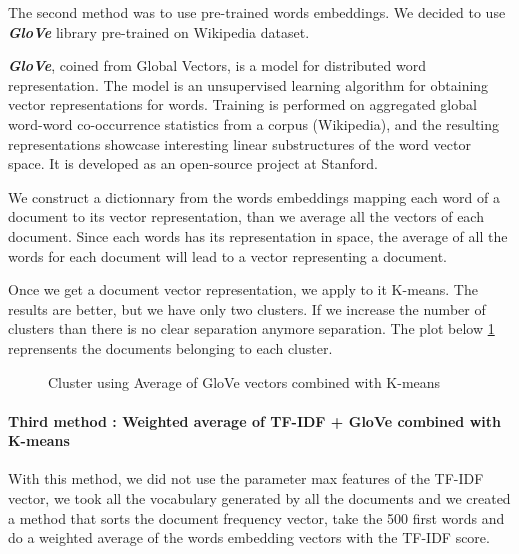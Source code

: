 \documentclass[article,twocolumn]{IEEEtran}
\begin{document}
The second method was to use pre-trained words embeddings. We decided to
use \textbf{\emph{GloVe}} library pre-trained on Wikipedia dataset.

\textbf{\emph{GloVe}}, coined from Global Vectors, is a model for
distributed word representation. The model is an unsupervised learning
algorithm for obtaining vector representations for words. Training is
performed on aggregated global word-word co-occurrence statistics from a
corpus (Wikipedia), and the resulting representations showcase
interesting linear substructures of the word vector space. It is
developed as an open-source project at Stanford.\cite{GloVe}

We construct a dictionnary from the words embeddings mapping each word
of a document to its vector representation, than we average all the
vectors of each document. Since each words has its representation in
space, the average of all the words for each document will lead to a
vector representing a document.

Once we get a document vector representation, we apply to it K-means.
The results are better, but we have only two clusters. If we increase
the number of clusters than there is no clear separation anymore
separation. The plot below \ref{fig4} reprensents the documents
belonging to each cluster.


    \begin{figure}
        \begin{center}\end{center}
        \caption{Cluster using Average of GloVe vectors combined with K-means }
        \label{fig4}
    \end{figure}
    
    \hypertarget{third-method-weighted-average-of-tf-idf-glove-combined-with-k-means}{%
\paragraph{Third method : Weighted average of TF-IDF + GloVe combined
with
K-means}\label{third-method-weighted-average-of-tf-idf-glove-combined-with-k-means}}

With this method, we did not use the parameter max features of the
TF-IDF vector, we took all the vocabulary generated by all the documents
and we created a method that sorts the document frequency vector, take
the 500 first words and do a weighted average of the words embedding
vectors with the TF-IDF score.
\end{document}
